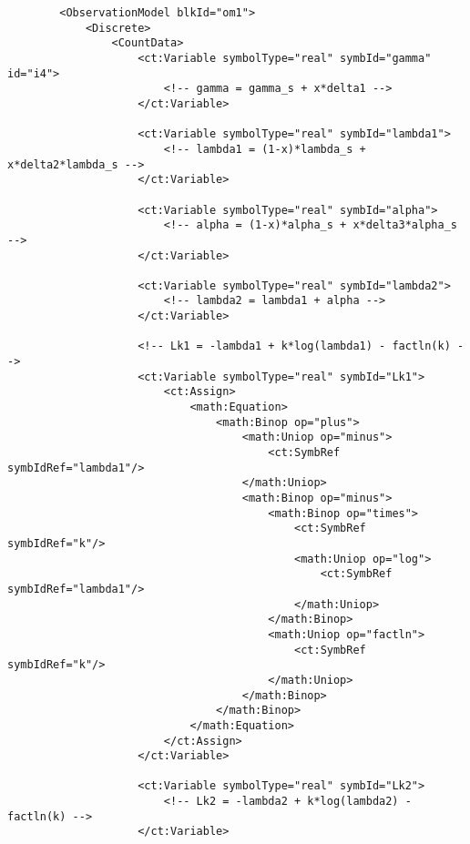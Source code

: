 \lstset{language=XML}
\begin{lstlisting}
        <ObservationModel blkId="om1">
            <Discrete>
                <CountData>
                    <ct:Variable symbolType="real" symbId="gamma" id="i4">
                        <!-- gamma = gamma_s + x*delta1 -->
                    </ct:Variable>
                    
                    <ct:Variable symbolType="real" symbId="lambda1">
                        <!-- lambda1 = (1-x)*lambda_s + x*delta2*lambda_s -->
                    </ct:Variable>
                    
                    <ct:Variable symbolType="real" symbId="alpha">
                        <!-- alpha = (1-x)*alpha_s + x*delta3*alpha_s -->
                    </ct:Variable>
                    
                    <ct:Variable symbolType="real" symbId="lambda2">
                        <!-- lambda2 = lambda1 + alpha -->
                    </ct:Variable>
                    
                    <!-- Lk1 = -lambda1 + k*log(lambda1) - factln(k) -->
                    <ct:Variable symbolType="real" symbId="Lk1">
                        <ct:Assign>
                            <math:Equation>
                                <math:Binop op="plus">
                                    <math:Uniop op="minus">
                                        <ct:SymbRef symbIdRef="lambda1"/>
                                    </math:Uniop>
                                    <math:Binop op="minus">
                                        <math:Binop op="times">
                                            <ct:SymbRef symbIdRef="k"/>
                                            <math:Uniop op="log">
                                                <ct:SymbRef symbIdRef="lambda1"/>
                                            </math:Uniop>
                                        </math:Binop>
                                        <math:Uniop op="factln">
                                            <ct:SymbRef symbIdRef="k"/>
                                        </math:Uniop>
                                    </math:Binop>
                                </math:Binop>
                            </math:Equation>
                        </ct:Assign>
                    </ct:Variable>
                    
                    <ct:Variable symbolType="real" symbId="Lk2">
                        <!-- Lk2 = -lambda2 + k*log(lambda2) - factln(k) -->
                    </ct:Variable>
                    

\end{lstlisting}
